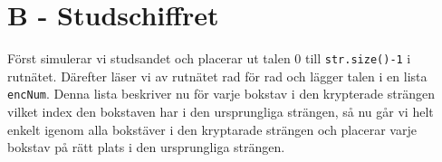 \section*{B - Studschiffret}
Först simulerar vi studsandet och placerar ut talen 0 till \texttt{str.size()-1} i rutnätet.
Därefter läser vi av rutnätet rad för rad och lägger talen i en lista \texttt{encNum}.
Denna lista beskriver nu för varje bokstav i den krypterade strängen vilket index
den bokstaven har i den ursprungliga strängen,
så nu går vi helt enkelt igenom alla bokstäver i den kryptarade strängen
 och placerar varje bokstav på rätt plats i den ursprungliga strängen.
